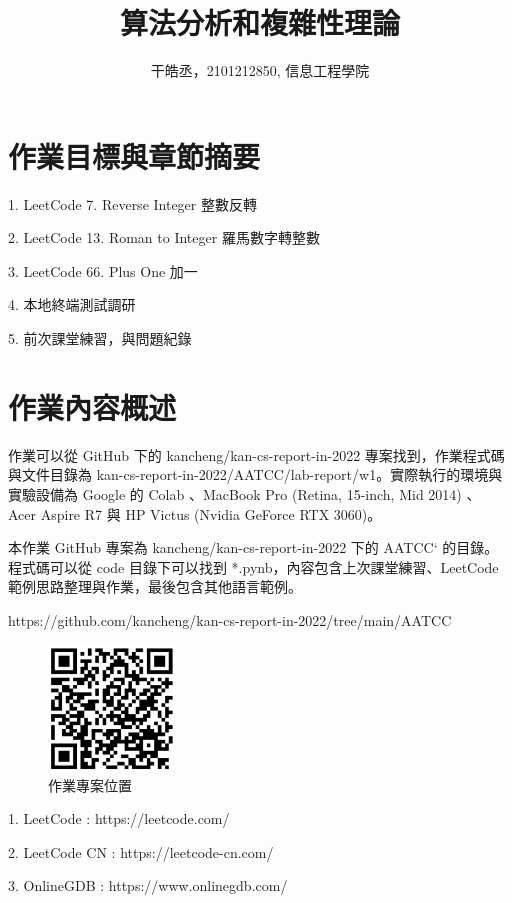 \documentclass[10pt,UTF8]{ctexart}
\title{算法分析和複雜性理論}
\author{干皓丞，2101212850, 信息工程學院}
\begin{document}
\maketitle


\section{作業目標與章節摘要}

1. LeetCode 7. Reverse Integer 整數反轉

2. LeetCode 13. Roman to Integer 羅馬數字轉整數

3. LeetCode 66. Plus One 加一

4. 本地終端測試調研

5. 前次課堂練習，與問題紀錄

\section{作業內容概述}

作業可以從 GitHub 下的 kancheng/kan-cs-report-in-2022 專案找到，作業程式碼與文件目錄為 kan-cs-report-in-2022/AATCC/lab-report/w1。實際執行的環境與實驗設備為 Google 的 Colab 、MacBook Pro (Retina, 15-inch, Mid 2014) 、 Acer Aspire R7 與 HP Victus (Nvidia GeForce RTX 3060)。

本作業 GitHub 專案為 kancheng/kan-cs-report-in-2022 下的 AATCC` 的目錄。程式碼可以從 code 目錄下可以找到 *.pynb，內容包含上次課堂練習、LeetCode 範例思路整理與作業，最後包含其他語言範例。

https://github.com/kancheng/kan-cs-report-in-2022/tree/main/AATCC

\begin{figure}[H]
\centering 
\includegraphics[width=0.30\textwidth]{aatccqr.png} 
\caption{作業專案位置}
\label{Test}
\end{figure}


1. LeetCode : https://leetcode.com/

2. LeetCode CN : https://leetcode-cn.com/

3. OnlineGDB : https://www.onlinegdb.com/ 
\end{document}
